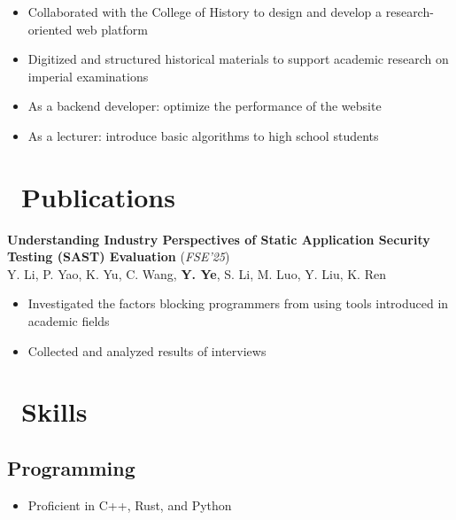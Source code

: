 \documentclass{resume}
\begin{document}
\begin{itemize}[itemsep=0.5ex]
  \item Collaborated with the College of History to design and develop a research-oriented web platform
  \item Digitized and structured historical materials to support academic research on imperial examinations
\end{itemize}

\begin{itemize}[itemsep=0.5ex]
  \item As a backend developer: optimize the performance of the website
  \item As a lecturer: introduce basic algorithms to high school students
\end{itemize}


\section{\faBookmarkO\ Publications}

\textbf{Understanding Industry Perspectives of Static Application Security Testing (SAST) Evaluation} (\textit{FSE'25})\\
Y. Li, P. Yao, K. Yu, C. Wang, \textbf{Y. Ye}, S. Li, M. Luo, Y. Liu, K. Ren
\begin{itemize}[itemsep=0.5ex]
  \item Investigated the factors blocking programmers from using tools introduced in academic fields
  \item Collected and analyzed results of interviews
\end{itemize}

\section{\faCogs\ Skills}
\subsection{\textbf{Programming}}
\begin{itemize}[itemsep=0.5ex]
  \item Proficient in C++, Rust, and Python
\end{itemize}
\end{document}
